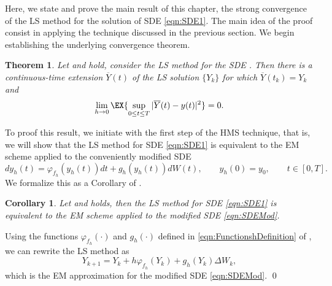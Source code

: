 \documentclass[3p]{elsarticle}
\theoremstyle{definition}
\theoremstyle{plain}%
\newtheorem{thm}{Theorem}[section]
\newtheorem{corollary}{Corollary}[section]
\theoremstyle{remark}
\newcommand{\SM}{LS\xspace}
\begin{document}
	Here, we state and prove the main result of this chapter, the strong convergence of the \SM method
  for the solution of SDE \eqref{eqn:SDE1}.
The main idea of the proof consist in applying the technique discussed in the previous section.
We begin establishing the underlying convergence theorem.
\begin{thm} %
	\label{thm:StrongConvergenceLSMethod}
	Let  and  hold, consider the \SM method  for the 
	SDE	.
	Then there is a continuous-time extension $\overline{Y}(t)$ of the \SM solution $\{Y_k\}$ for which 
	$\overline{Y}(t_k)=Y_k$ and
	\begin{equation*}
	\lim_{h \to 0}
	\EX{
		\sup_{0\leq t \leq T}
		|\overline{Y}(t) - y(t)|^2	
	}=0.
	\end{equation*} 
\end{thm}
To proof this result, we initiate with the first step of the HMS technique, that is, we will show that the \SM method
for SDE \eqref{eqn:SDE1} is equivalent to the EM scheme applied to the conveniently modified SDE
	\begin{equation} \label{eqn:SDEMod}
		dy_h(t)= \varphi_{f_h}(y_h(t))dt +g_h(y_h(t))dW(t),
		\qquad y_h(0)=y_0,  \qquad t\in [0,T].
	\end{equation}
We formalize this as a Corollary of .

\begin{corollary}\label{col:SSSMeEMmod}
	Let  and  holds, then the \SM method for SDE \eqref{eqn:SDE1} is 
	equivalent to the EM scheme applied to the modified SDE \eqref{eqn:SDEMod}.
\end{corollary}
\begin{pf}
	Using the functions $\varphi_{f_h}(\cdot)$ and $g_h(\cdot)$ defined in \eqref{eqn:FunctionshDefinition} of 
	, we 
	can rewrite the \SM method  as 
	$$
		Y_{k+1} = Y_k + h \varphi_{f_h}(Y_k) + g_h(Y_k)\Delta W_k,
	$$
	which is the EM approximation for the modified SDE \eqref{eqn:SDEMod}. \qed
\end{pf}
\end{document}
